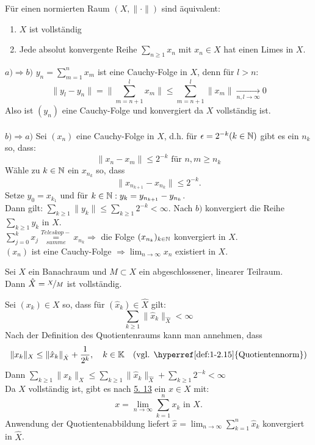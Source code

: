 \begin{lemma} \label{lemma:5.13}
	Für einen normierten Raum $(X, \| \cdot \|)$ sind äquivalent:
	\begin{enumerate}[label=\alph*\upshape)]
		\item $X$ ist vollständig
		\item Jede absolut konvergente Reihe $\sum_{n \geq 1} x_{n}$ mit $x_{n} \in X$ hat einen Limes in $X$.
	\end{enumerate}	
\end{lemma}

\begin{beweis}
	$a) \Rightarrow b)$	$y_{n} = \sum_{m = 1}^{n} x_{m}$ ist eine Cauchy-Folge in $X$, denn für $l > n$:
		\[ \| y_{l} - y_{n} \| = \| \sum_{m = n + 1}^{l} x_{m} \| \leq \sum_{m = n + 1}^{l} \| x_{m} \| \xrightarrow[n, l \rightarrow \infty]{} 0 \]
	Also ist $(y_{n})$ eine Cauchy-Folge und konvergiert da $X$ vollständig ist. \\ \\
	$b) \Rightarrow a)$	Sei $(x_{n})$ eine Cauchy-Folge in $X$, d.h. für $\epsilon = 2^{-k} (k \in \mathbb{N})$ gibt es ein $n_{k}$ so, dass:
		\[ \| x_{n} - x_{m} \| \leq 2^{-k} \text{ für } n, m \geq n_{k} \]
		Wähle zu $k \in \mathbb{N}$ ein $x_{n_{k}}$ so, dass
		\[ \| x_{n_{k+1}} - x_{n_{k}} \| \leq 2^{-k}.\]
		Setze $y_{0} = x_{k_{1}}$ und für $k \in \mathbb{N}: y_{k} = y_{n_{k+1}} - y_{n_{k}}$. \\
		Dann gilt: $\sum_{k \geq 1} \| y_{k} \| \leq \sum_{k \geq 1} 2^{-k} < \infty$. Nach $b)$ konvergiert die Reihe $\sum_{k \geq 1} y_{k}$ in $X$. \\
		$\sum_{j = 0}^{k} x_{j} \underset{summe}{\overset{Teleskop-}{=}}x_{n_{k}} \Rightarrow $ die Folge $(x_{n_{k}})_{k \in \mathbb{N}}$ konvergiert in $X$. \\
		$(x_{n})$ ist eine Cauchy-Folge $\Rightarrow \lim_{n \rightarrow \infty} x_{n}$ existiert in $X$.
\end{beweis}


\begin{kor}
	Sei $X$ ein Banachraum und $M \subset X$ ein abgeschlossener, linearer Teilraum. \\
	Dann $\hat X = \nicefrac{X}{M}$ ist vollständig.
	\begin{beweis}	
		Sei $(x_{k}) \in X$ so, dass für $(\hat x_{k}) \in \hat X$ gilt:
		\[ \sum_{k \geq 1} \| \hat x_{k} \|_{\hat X} < \infty \]
		Nach der Definition des Quotientenraums kann man annehmen, dass
		\[ \| x_{k} \|_{X} \leq \| \hat x_{k} \|_{\hat X} + \frac{1}{2^{k}}, \quad k \in \MdK \quad \text{(vgl. \hyperref[def:1-2.15]{Quotientennorm})} \]
		Dann $\sum_{k \geq 1} \| x_{k} \|_{X} \leq \sum_{k \geq 1} \| \hat x_{k} \|_{\hat X} + \sum_{k \geq 1} 2^{-k} < \infty$ \\
		Da $X$ vollständig ist, gibt es nach \hyperref[lemma:1-5.13]{5. 13} ein $x \in X$ mit:
			\[ x = \lim_{n \rightarrow \infty} \sum_{k = 1}^{n} x_{k} \text{ in } X. \]
		Anwendung der Quotientenabbildung liefert $\hat x = \lim_{n \rightarrow \infty} \sum_{k = 1}^{n} \hat x_{k}$ konvergiert in $\hat X$.
	\end{beweis}
\end{kor}



